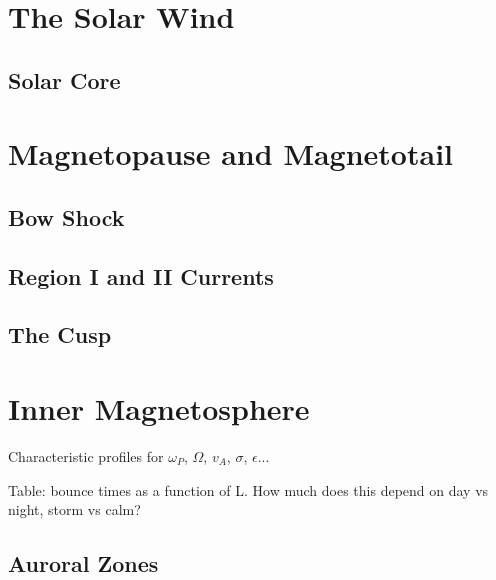 \section{The Solar Wind}

\subsection{Solar Core}

\section{Magnetopause and Magnetotail}

\subsection{Bow Shock}

\subsection{Region I and II Currents}

\subsection{The Cusp}

\section{Inner Magnetosphere}

Characteristic profiles for $\omega_P$, $\Omega$, $v_A$, $\sigma$, $\epsilon$...

Table: bounce times as a function of L. How much does this depend on day vs night, storm vs calm? 

\subsection{Auroral Zones}

